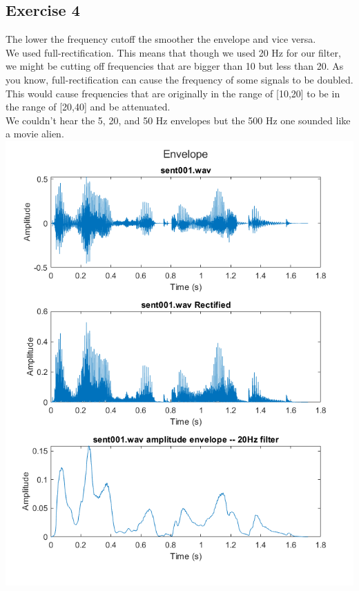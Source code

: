 \documentclass[11pt]{article}
\begin{document}
\subsection{Exercise 4}

The lower the frequency cutoff the smoother the envelope and vice versa.\\

We used full-rectification.
This means that though we used 20 Hz for our filter, we might be cutting off frequencies that are bigger than 10 but less than 20.
As you know, full-rectification can cause the frequency of some signals to be doubled.
This would cause frequencies that are originally in the range of [10,20] to be in the range of [20,40] and be attenuated.\\

We couldn't hear the 5, 20, and 50 Hz envelopes but the 500 Hz one sounded like a movie alien.\\



\includegraphics[width=\textwidth]{exercise4.png}
\end{document}
